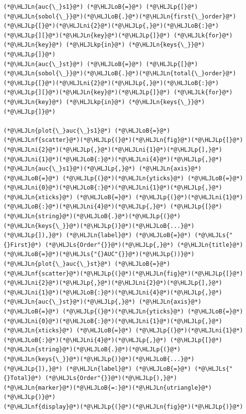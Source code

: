 \documentclass[12pt,a4paper]{article}
\newcommand{\HLJLk}[1]{\textcolor[RGB]{148,91,176}{\textbf{#1}}}
\newcommand{\HLJLkp}[1]{\textcolor[RGB]{148,91,176}{\textbf{#1}}}
\newcommand{\HLJLn}[1]{#1}
\newcommand{\HLJLnf}[1]{\textcolor[RGB]{66,102,213}{#1}}
\newcommand{\HLJLs}[1]{\textcolor[RGB]{201,61,57}{#1}}
\newcommand{\HLJLni}[1]{\textcolor[RGB]{59,151,46}{#1}}
\newcommand{\HLJLoB}[1]{\textcolor[RGB]{102,102,102}{\textbf{#1}}}
\newcommand{\HLJLp}[1]{#1}
\begin{document}
\begin{lstlisting}
(*@\HLJLn{auc{\_}s1}@*) (*@\HLJLoB{=}@*) (*@\HLJLp{[}@*)(*@\HLJLn{sobol{\_}}@*)(*@\HLJLoB{.}@*)(*@\HLJLn{first{\_}order}@*)(*@\HLJLp{[}@*)(*@\HLJLni{2}@*)(*@\HLJLp{,}@*)(*@\HLJLoB{:}@*)(*@\HLJLp{][}@*)(*@\HLJLn{key}@*)(*@\HLJLp{]}@*) (*@\HLJLk{for}@*) (*@\HLJLn{key}@*) (*@\HLJLkp{in}@*) (*@\HLJLn{keys{\_}}@*)(*@\HLJLp{]}@*)
(*@\HLJLn{auc{\_}st}@*) (*@\HLJLoB{=}@*) (*@\HLJLp{[}@*)(*@\HLJLn{sobol{\_}}@*)(*@\HLJLoB{.}@*)(*@\HLJLn{total{\_}order}@*)(*@\HLJLp{[}@*)(*@\HLJLni{2}@*)(*@\HLJLp{,}@*)(*@\HLJLoB{:}@*)(*@\HLJLp{][}@*)(*@\HLJLn{key}@*)(*@\HLJLp{]}@*) (*@\HLJLk{for}@*) (*@\HLJLn{key}@*) (*@\HLJLkp{in}@*) (*@\HLJLn{keys{\_}}@*)(*@\HLJLp{]}@*)

(*@\HLJLn{plot{\_}auc{\_}s1}@*) (*@\HLJLoB{=}@*) (*@\HLJLnf{scatter}@*)(*@\HLJLp{(}@*)(*@\HLJLn{fig}@*)(*@\HLJLp{[}@*)(*@\HLJLni{2}@*)(*@\HLJLp{,}@*)(*@\HLJLni{1}@*)(*@\HLJLp{],}@*) (*@\HLJLni{1}@*)(*@\HLJLoB{:}@*)(*@\HLJLni{4}@*)(*@\HLJLp{,}@*) (*@\HLJLn{auc{\_}s1}@*)(*@\HLJLp{,}@*) (*@\HLJLn{axis}@*) (*@\HLJLoB{=}@*) (*@\HLJLp{(}@*)(*@\HLJLn{yticks}@*) (*@\HLJLoB{=}@*) (*@\HLJLni{0}@*)(*@\HLJLoB{:}@*)(*@\HLJLni{1}@*)(*@\HLJLp{,}@*) (*@\HLJLn{xticks}@*) (*@\HLJLoB{=}@*) (*@\HLJLp{(}@*)(*@\HLJLni{1}@*)(*@\HLJLoB{:}@*)(*@\HLJLni{4}@*)(*@\HLJLp{,}@*) (*@\HLJLp{[}@*)(*@\HLJLn{string}@*)(*@\HLJLoB{.}@*)(*@\HLJLp{(}@*)(*@\HLJLn{keys{\_}}@*)(*@\HLJLp{)}@*)(*@\HLJLoB{...}@*)(*@\HLJLp{]),}@*) (*@\HLJLn{label}@*) (*@\HLJLoB{=}@*) (*@\HLJLs{"{}First}@*) (*@\HLJLs{Order"{}}@*)(*@\HLJLp{,}@*) (*@\HLJLn{title}@*)(*@\HLJLoB{=}@*)(*@\HLJLs{"{}AUC"{}}@*)(*@\HLJLp{))}@*)
(*@\HLJLn{plot{\_}auc{\_}st}@*) (*@\HLJLoB{=}@*) (*@\HLJLnf{scatter}@*)(*@\HLJLp{(}@*)(*@\HLJLn{fig}@*)(*@\HLJLp{[}@*)(*@\HLJLni{2}@*)(*@\HLJLp{,}@*)(*@\HLJLni{2}@*)(*@\HLJLp{],}@*) (*@\HLJLni{1}@*)(*@\HLJLoB{:}@*)(*@\HLJLni{4}@*)(*@\HLJLp{,}@*) (*@\HLJLn{auc{\_}st}@*)(*@\HLJLp{,}@*) (*@\HLJLn{axis}@*) (*@\HLJLoB{=}@*) (*@\HLJLp{(}@*)(*@\HLJLn{yticks}@*) (*@\HLJLoB{=}@*) (*@\HLJLni{0}@*)(*@\HLJLoB{:}@*)(*@\HLJLni{1}@*)(*@\HLJLp{,}@*) (*@\HLJLn{xticks}@*) (*@\HLJLoB{=}@*) (*@\HLJLp{(}@*)(*@\HLJLni{1}@*)(*@\HLJLoB{:}@*)(*@\HLJLni{4}@*)(*@\HLJLp{,}@*) (*@\HLJLp{[}@*)(*@\HLJLn{string}@*)(*@\HLJLoB{.}@*)(*@\HLJLp{(}@*)(*@\HLJLn{keys{\_}}@*)(*@\HLJLp{)}@*)(*@\HLJLoB{...}@*)(*@\HLJLp{]),}@*) (*@\HLJLn{label}@*) (*@\HLJLoB{=}@*) (*@\HLJLs{"{}Total}@*) (*@\HLJLs{Order"{}}@*)(*@\HLJLp{),}@*) (*@\HLJLn{marker}@*)(*@\HLJLoB{=:}@*)(*@\HLJLn{utriangle}@*)(*@\HLJLp{)}@*)
(*@\HLJLnf{display}@*)(*@\HLJLp{(}@*)(*@\HLJLn{fig}@*)(*@\HLJLp{)}@*)
\end{lstlisting}
\end{document}

